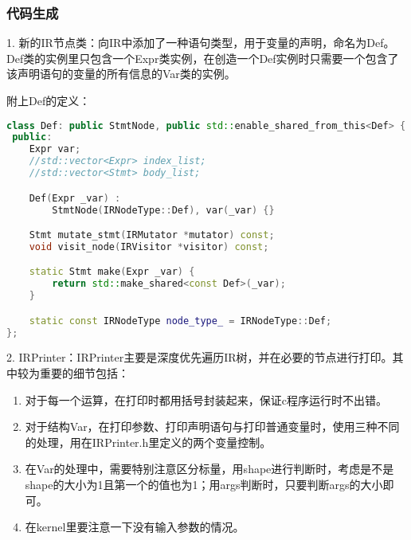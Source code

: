 \documentclass[a4paper,11pt]{ctexart}
\begin{document}
\subsubsection*{代码生成}

1. 新的IR节点类：向IR中添加了一种语句类型，用于变量的声明，命名为Def。Def类的实例里只包含一个Expr类实例，在创造一个Def实例时只需要一个包含了该声明语句的变量的所有信息的Var类的实例。

附上Def的定义：
\begin{lstlisting}[breaklines,language=c++]
class Def: public StmtNode, public std::enable_shared_from_this<Def> {
 public:
    Expr var;
    //std::vector<Expr> index_list;
    //std::vector<Stmt> body_list;

    Def(Expr _var) :
        StmtNode(IRNodeType::Def), var(_var) {}

    Stmt mutate_stmt(IRMutator *mutator) const;
    void visit_node(IRVisitor *visitor) const;

    static Stmt make(Expr _var) {
        return std::make_shared<const Def>(_var);
    }

    static const IRNodeType node_type_ = IRNodeType::Def;
};
\end{lstlisting}

2. IRPrinter：IRPrinter主要是深度优先遍历IR树，并在必要的节点进行打印。其中较为重要的细节包括：
\begin{enumerate}[1)]
\item 对于每一个运算，在打印时都用括号封装起来，保证c程序运行时不出错。
\item 对于结构Var，在打印参数、打印声明语句与打印普通变量时，使用三种不同的处理，用在IRPrinter.h里定义的两个变量控制。
\item 在Var的处理中，需要特别注意区分标量，用shape进行判断时，考虑是不是shape的大小为1且第一个的值也为1；用args判断时，只要判断args的大小即可。
\item 在kernel里要注意一下没有输入参数的情况。
\end{enumerate}
\end{document}
